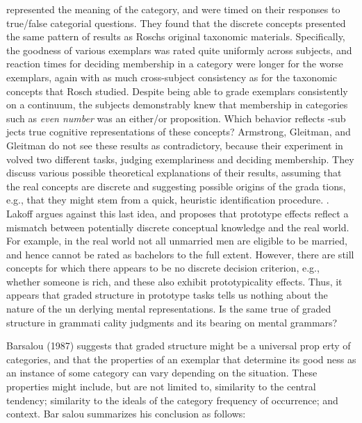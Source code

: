 \begin{styleStandard}
represented the meaning of the category, and were timed on their responses to true/false categorial questions. They found that the discrete concepts presented the same pattern of results as Rosch{\textquotesingle}s original taxonomic materials. Specifically, the goodness of various exemplars was rated quite uniformly across subjects, and reaction times for deciding membership in a category were longer for the worse exemplars, again with as much cross-subject consistency as for the taxonomic concepts that Rosch studied. Despite being able to grade exemplars consistently on a continuum, the subjects demonstrably knew that membership in categories such as \textit{even number}\textit{ }was an either/or proposition. Which behavior reflects {}-sub\- jects{\textquotesingle} true cognitive representations of these concepts? Armstrong, Gleitman, and Gleitman do not see these results as contradictory, because their experiment in\- volved two different tasks, judging exemplariness and deciding membership. They discuss various possible theoretical explanations of their results, assuming that the real concepts are discrete and suggesting possible origins of the grada\- tions, e.g., that they might stem from a quick, heuristic identification procedure. . Lakoff argues against this last idea, and proposes that prototype effects reflect a mismatch between potentially discrete conceptual knowledge and the real world. For example, in the real world not all unmarried men are eligible to be married, and hence cannot be rated as bachelors to the full extent. However, there are still concepts for which there appears to be no discrete decision criterion, e.g., whether someone is rich, and these also exhibit prototypicality effects. Thus, it appears that graded structure in prototype tasks tells us nothing about the nature of the un\- derlying mental representations. Is the same true of graded structure in grammati\- cality judgments and its bearing on mental grammars?
\end{styleStandard}


\begin{styleStandard}
Barsalou (1987) suggests that graded structure might be a universal prop\- erty of categories, and that the properties of an exemplar that determine its good\- ness as an instance of some category can vary depending on the situation. These properties might include, but are not limited to, similarity to the central tendency; similarity to the ideals of the category frequency of occurrence; and context. Bar\- salou summarizes his conclusion as follows:
\end{styleStandard}


